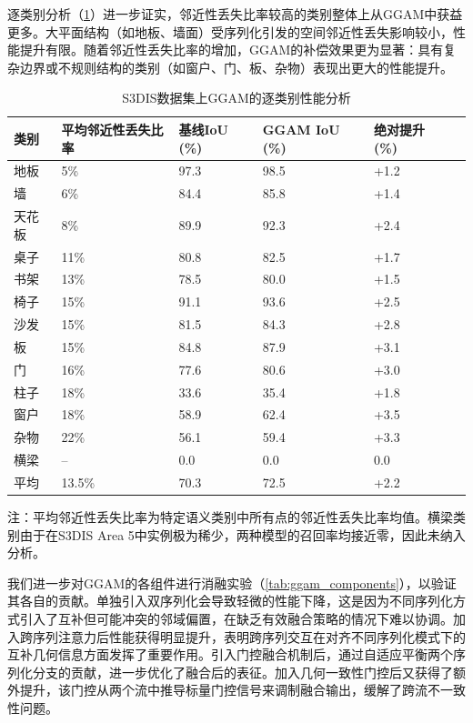 \documentclass[12pt,a4paper,openany,oneside]{ctexbook}
\theoremstyle{definition}
\theoremstyle{remark}
\begin{document}
逐类别分析（\cref{tab:ggam_category}）进一步证实，邻近性丢失比率较高的类别整体上从GGAM中获益更多。大平面结构（如地板、墙面）受序列化引发的空间邻近性丢失影响较小，性能提升有限。随着邻近性丢失比率的增加，GGAM的补偿效果更为显著：具有复杂边界或不规则结构的类别（如窗户、门、板、杂物）表现出更大的性能提升。

\begin{table}[htbp!]
	\centering
	\caption{S3DIS数据集上GGAM的逐类别性能分析}
	\label{tab:ggam_category}
	\begin{tabular}{@{}llllll@{}}
		\toprule
		类别 & 平均邻近性丢失比率 & 基线IoU (\%) & GGAM IoU (\%) & 绝对提升 (\%) \\
		\midrule
		地板   & 5\%    & 97.3  & 98.5  & +1.2 \\
		墙     & 6\%    & 84.4  & 85.8  & +1.4 \\
		天花板 & 8\%    & 89.9  & 92.3  & +2.4 \\
		桌子   & 11\%   & 80.8  & 82.5  & +1.7 \\
		书架   & 13\%   & 78.5  & 80.0  & +1.5 \\
		椅子   & 15\%   & 91.1  & 93.6  & +2.5 \\
		沙发   & 15\%   & 81.5  & 84.3  & +2.8 \\
		板     & 15\%   & 84.8  & 87.9  & +3.1 \\
		门     & 16\%   & 77.6  & 80.6  & +3.0 \\
		柱子   & 18\%   & 33.6  & 35.4  & +1.8 \\
		窗户   & 18\%   & 58.9  & 62.4  & +3.5 \\
		杂物   & 22\%   & 56.1  & 59.4  & +3.3 \\
		横梁   & --     & 0.0   & 0.0   & 0.0 \\
		\midrule
		平均   & 13.5\% & 70.3  & 72.5  & +2.2 \\
		\bottomrule
	\end{tabular}
	\par\vspace{3pt}
	\footnotesize 注：平均邻近性丢失比率为特定语义类别中所有点的邻近性丢失比率均值。横梁类别由于在S3DIS Area 5中实例极为稀少，两种模型的召回率均接近零，因此未纳入分析。
\end{table}

我们进一步对GGAM的各组件进行消融实验（\cref{tab:ggam_components}），以验证其各自的贡献。单独引入双序列化会导致轻微的性能下降，这是因为不同序列化方式引入了互补但可能冲突的邻域偏置，在缺乏有效融合策略的情况下难以协调。加入跨序列注意力后性能获得明显提升，表明跨序列交互在对齐不同序列化模式下的互补几何信息方面发挥了重要作用。引入门控融合机制后，通过自适应平衡两个序列化分支的贡献，进一步优化了融合后的表征。加入几何一致性门控后又获得了额外提升，该门控从两个流中推导标量门控信号来调制融合输出，缓解了跨流不一致性问题。
\end{document}
